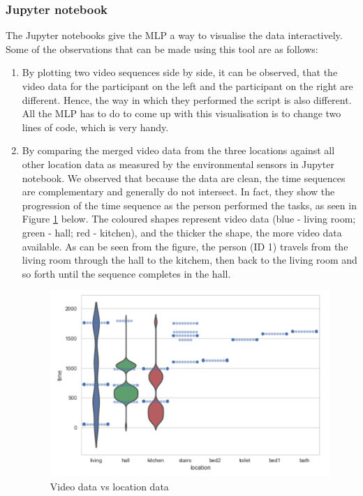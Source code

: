 \documentclass[fleqn,10pt]{SelfArx} %
\begin{document}
\subsubsection{Jupyter notebook}
The Jupyter notebooks give the MLP a way to visualise the data interactively. Some of the observations that can be made using this tool are as follows:
\begin{enumerate}
\item By plotting two video sequences side by side, it can be observed, that the video data for the participant on the left and the participant on the right are different. Hence, the way in which they performed the script is also different. All the MLP has to do to come up with this visualisation is to change two lines of code, which is very handy. 
\item By comparing the merged video data from the three locations against all other location data as measured by the environmental sensors in Jupyter notebook. We observed that because the data are clean, the time sequences are complementary and generally do not intersect. In fact, they show the progression of the time sequence as the person performed the tasks, as seen in Figure \ref{fig:vidnloc} below. The coloured shapes represent video data (blue - living room; green - hall; red - kitchen), and the thicker the shape, the more video data available. As can be seen from the figure, the person (ID 1) travels from the living room through the hall to the kitchem, then back to the living room and so forth until the sequence completes in the hall.  \\
 
\begin{figure}[!h] \centering
	\includegraphics[scale=0.5]{vidnloc} 
	\caption{Video data vs location data}
	\label{fig:vidnloc}
\end{figure}

\end{enumerate}
\end{document}

